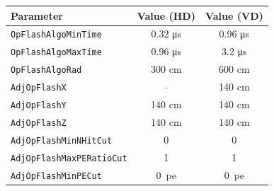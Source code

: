 \begin{tabular}{lcc}
    \toprule
    \textbf{Parameter} & \textbf{Value (HD)} & \textbf{Value (VD)} \\
    \midrule
    \texttt{OpFlashAlgoMinTime} & 0.32 \si{\micro\second} & 0.96 \si{\micro\second} \\
    \texttt{OpFlashAlgoMaxTime} & 0.96 \si{\micro\second} & 3.2 \si{\micro\second} \\
    \texttt{OpFlashAlgoRad} & 300 \si{\centi\meter} & 600 \si{\centi\meter} \\
    \texttt{AdjOpFlashX} & -- & 140 \si{\centi\meter} \\
    \texttt{AdjOpFlashY} & 140 \si{\centi\meter} & 140 \si{\centi\meter} \\
    \texttt{AdjOpFlashZ} & 140 \si{\centi\meter} & 140 \si{\centi\meter} \\
    \texttt{AdjOpFlashMinNHitCut} & 0 & 0 \\
    \texttt{AdjOpFlashMaxPERatioCut} & 1 & 1 \\
    \texttt{AdjOpFlashMinPECut} & 0~\acrshort{pe} & 0~\acrshort{pe} \\
    \bottomrule
\end{tabular}
